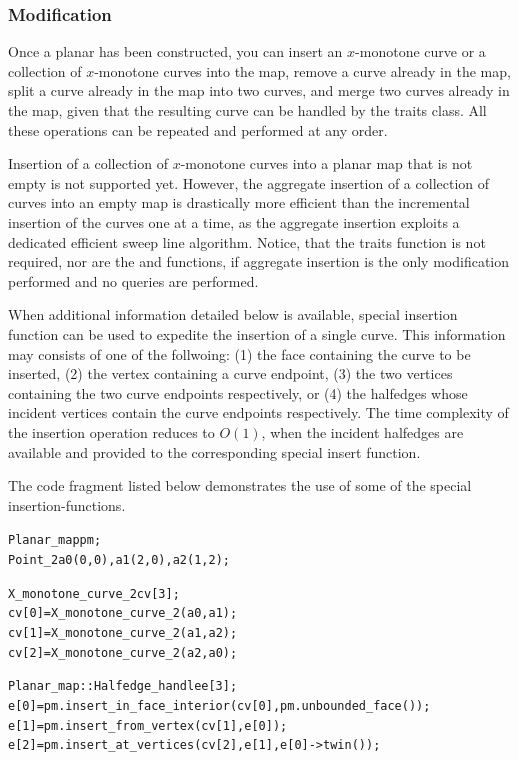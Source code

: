 \subsubsection{Modification}
Once a planar has been constructed, you can insert an $x$-monotone
curve or a collection of $x$-monotone curves into the map, remove a
curve already in the map, split a curve already in the map into two
curves, and merge two curves already in the map, given that the
resulting curve can be handled by the traits class. All these
operations can be repeated and performed at any order.

Insertion of a collection of $x$-monotone curves into a planar map
that is not empty is not supported yet. However, the aggregate
insertion of a collection of curves into an empty map is drastically
more efficient than the incremental insertion of the curves one at a
time, as the aggregate insertion exploits a dedicated efficient sweep
line algorithm. Notice, that the traits function
 is not required, nor are the
 and 
functions, if aggregate insertion is the only modification performed
and no queries are performed. 


When additional information detailed below is available, special
insertion function can be used to expedite the insertion of a single
curve. This information may consists of one of the follwoing: (1) the
face containing the curve to be inserted, (2) the vertex containing a
curve endpoint, (3) the two vertices containing the two curve
endpoints respectively, or (4) the halfedges whose incident vertices
contain the curve endpoints respectively. The time complexity of the
insertion operation reduces to $O(1)$, when the incident halfedges are
available and provided to the corresponding special insert function.

The code fragment listed below demonstrates the use of some of the
special insertion-functions.

\begin{alltt}
  Planar_map pm;
  Point_2 a0(0, 0), a1(2, 0), a2(1, 2);

  X_monotone_curve_2 cv[3];
  cv[0] = X_monotone_curve_2(a0, a1);
  cv[1] = X_monotone_curve_2(a1, a2);
  cv[2] = X_monotone_curve_2(a2, a0);

  Planar_map::Halfedge_handle e[3];  
  e[0] = pm.insert_in_face_interior(cv[0], pm.unbounded_face());
  e[1] = pm.insert_from_vertex(cv[1], e[0]);
  e[2] = pm.insert_at_vertices(cv[2], e[1], e[0]->twin());
\end{alltt}

